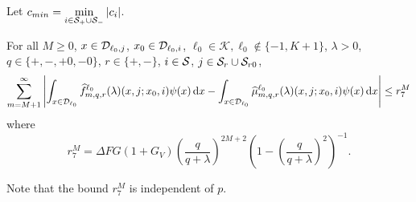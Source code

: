 
Let \(c_{min} = \min\limits_{i\in\mathcal S_{+}\cup\mathcal{S}_-} |c_i|\).
\begin{lem}\label{lem: gkjljklgagjklagsjlk}For all \(M\geq 0\), \(x\in\mathcal{D}_{\ell_0,j}\), \(x_0\in\mathcal{D}_{\ell_0,i}\), \(\ell_0\in\mathcal K, \ell_0\notin\{-1,K+1\}\), \(\lambda > 0\), \(q\in\{+,-,+0,-0\}\), \(r\in\{+,-\}\), \(i\in\mathcal{S}\), \(j\in\mathcal{S}_r\cup\mathcal{S}_{r0}\),
	\begin{align}
		\sum_{m=M+1}^\infty \left| \int_{x\in\mathcal{D}_{\ell_0}} \widehat f^{\ell_0}_{m,q,r}(\lambda)(x,j;x_0,i)\psi(x)\, \mathrm{d} x
		-
		\int_{x\in\mathcal{D}_{\ell_0}} \widehat \mu^{\ell_0}_{m,q,r}(\lambda)(x,j;x_0,i)\psi(x) \, \mathrm{d} x\right| \leq r_7^M
	\end{align}
	where 
	\[r_7^M =  \Delta FG(1+G_V)\left(\frac{q}{q+\lambda}\right)^{2M+2} \left(1-\left(\frac{q}{q+\lambda}\right)^2\right)^{-1} .\]
\end{lem}
Note that the bound \(r_7^M\) is independent of \(p\). 

